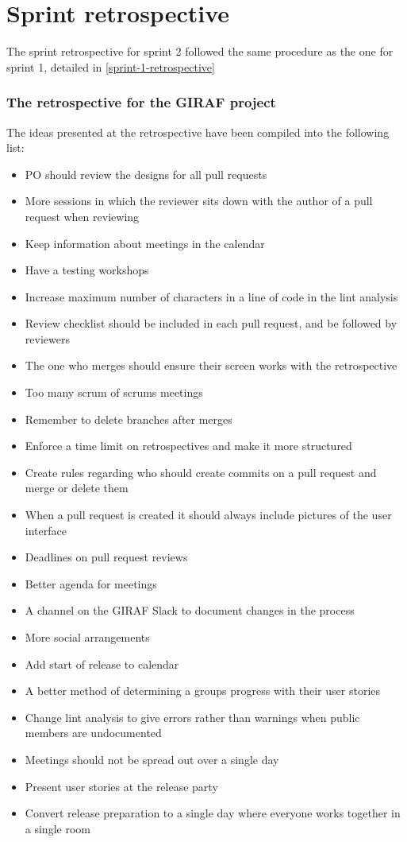 \section{Sprint retrospective}\label{sec:sprint-2-retrospective}
The sprint retrospective for sprint 2 followed the same procedure as the one for sprint 1, detailed in \autoref{sprint-1-retrospective}

\subsubsection{The retrospective for the GIRAF project}
The ideas presented at the retrospective have been compiled into the following list:
\begin{itemize}
    \item PO should review the designs for all pull requests
    \item More sessions in which the reviewer sits down with the author of a pull request when reviewing
    \item Keep information about meetings in the calendar
    \item Have a testing workshops
    \item Increase maximum number of characters in a line of code in the lint analysis
    \item Review checklist should be included in each pull request, and be followed by reviewers
    \item The one who merges should ensure their screen works with the retrospective
    \item Too many scrum of scrums meetings
    \item Remember to delete branches after merges
    \item Enforce a time limit on retrospectives and make it more structured
    \item Create rules regarding who should create commits on a pull request and merge or delete them
    \item When a pull request is created it should always include pictures of the user interface
    \item Deadlines on pull request reviews
    \item Better agenda for meetings
    \item A channel on the GIRAF Slack to document changes in the process
    \item More social arrangements
    \item Add start of release to calendar
    \item A better method of determining a groups progress with their user stories
    \item Change lint analysis to give errors rather than warnings when public members are undocumented
    \item Meetings should not be spread out over a single day
    \item Present user stories at the release party
    \item Convert release preparation to a single day where everyone works together in a single room
\end{itemize}
